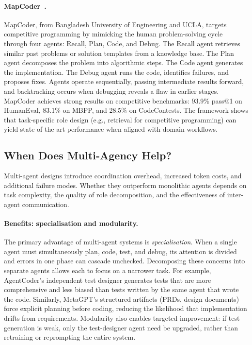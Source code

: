 \paragraph{MapCoder~\cite{islam2024mapcoder}.}
MapCoder, from Bangladesh University of Engineering and UCLA, targets
competitive programming by mimicking the human problem-solving cycle through
four agents: Recall, Plan, Code, and Debug. The Recall agent retrieves similar
past problems or solution templates from a knowledge base. The Plan agent
decomposes the problem into algorithmic steps. The Code agent generates the
implementation. The Debug agent runs the code, identifies failures, and
proposes fixes. Agents operate sequentially, passing intermediate results
forward, and backtracking occurs when debugging reveals a flaw in earlier
stages. MapCoder achieves strong results on competitive benchmarks: 93.9\%
pass@1 on HumanEval, 83.1\% on MBPP, and 28.5\% on CodeContests. The framework
shows that task-specific role design (e.g., retrieval for competitive
programming) can yield state-of-the-art performance when aligned with domain
workflows.

\subsection{When Does Multi-Agency Help?}
\label{sec:multi-when}

Multi-agent designs introduce coordination overhead, increased token costs, and
additional failure modes. Whether they outperform monolithic agents depends on
task complexity, the quality of role decomposition, and the effectiveness of
inter-agent communication.

\paragraph{Benefits: specialisation and modularity.}
The primary advantage of multi-agent systems is \emph{specialisation}. When a
single agent must simultaneously plan, code, test, and debug, its attention is
divided and errors in one phase can cascade unchecked. Decomposing these
concerns into separate agents allows each to focus on a narrower task. For
example, AgentCoder's independent test designer generates tests that are more
comprehensive and less biased than tests written by the same agent that wrote
the code. Similarly, MetaGPT's structured artifacts (PRDs, design documents)
force explicit planning before coding, reducing the likelihood that
implementation drifts from requirements. Modularity also enables targeted
improvement: if test generation is weak, only the test-designer agent need be
upgraded, rather than retraining or reprompting the entire system.

